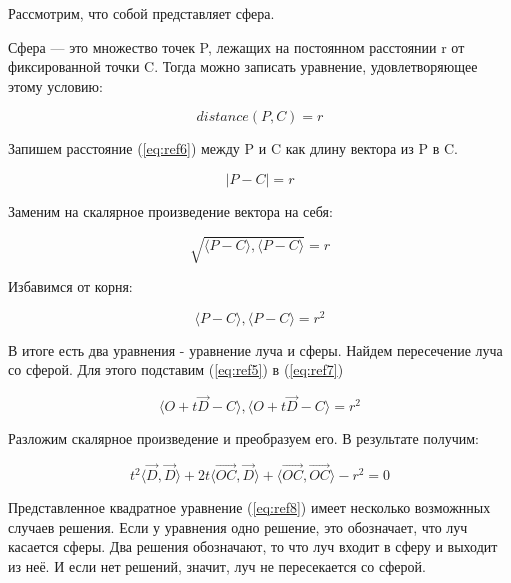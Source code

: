 Рассмотрим, что собой представляет сфера.


Сфера — это множество точек P, лежащих на постоянном расстоянии r от фиксированной точки C. Тогда можно записать уравнение, удовлетворяющее этому условию:

\begin{equation}
	distance(P,C) = r
	\label{eq:ref6}
\end{equation}

Запишем расстояние (\ref{eq:ref6}) между P и C как длину вектора из P в C.

\begin{equation}
	|P-C|=r
\end{equation}

Заменим на скалярное произведение вектора на себя:

\begin{equation}
	\sqrt{\langle P - C\rangle, \langle P - C\rangle} = r
\end{equation}

Избавимся от корня:

\begin{equation}
	\langle P - C\rangle, \langle P - C\rangle = r^2
	\label{eq:ref7}
\end{equation}

В итоге есть два уравнения - уравнение луча и сферы. Найдем пересечение луча со сферой. Для этого подставим (\ref{eq:ref5}) в (\ref{eq:ref7})

\begin{equation}
	\langle O + t\overrightarrow{D} - C \rangle, \langle O + t\overrightarrow{D} - C\rangle = r^2
\end{equation}

Разложим скалярное произведение и преобразуем его. В результате получим:

\begin{equation}
	t^2 \langle \overrightarrow{D}, \overrightarrow{D} \rangle + 2t \langle \overrightarrow{OC}, \overrightarrow{D} \rangle + \langle \overrightarrow{OC}, \overrightarrow{OC} \rangle -r^2 = 0
	\label{eq:ref8}
\end{equation}

Представленное квадратное уравнение (\ref{eq:ref8}) имеет несколько возможнных случаев решения.
Если у уравнения одно решение, это обозначает, что луч касается сферы.
Два решения обозначают, то что луч входит в сферу и выходит из неё.
И если нет решений, значит, луч не пересекается со сферой.

